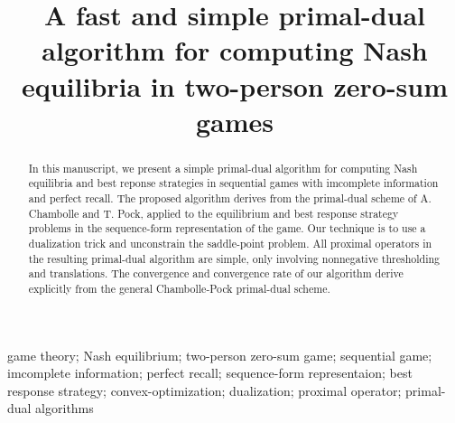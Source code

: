 \documentclass[a4paper,9pt,journal]{IEEEtran}
\begin{document}
\onecolumn
\title{A fast and simple primal-dual algorithm for computing Nash equilibria in two-person zero-sum games}


\author{}


\maketitle

\begin{abstract}
% 
In this manuscript, we present a simple primal-dual algorithm for computing Nash equilibria and best reponse strategies in  sequential games with
imcomplete information and perfect recall. The proposed algorithm derives from the primal-dual scheme of A. Chambolle and T. Pock, applied to the
equilibrium and best response strategy problems in the sequence-form representation of the game. Our technique is to use a dualization
trick and unconstrain the saddle-point problem. All proximal operators in the resulting primal-dual algorithm are simple,
only involving nonnegative thresholding and translations.
The convergence and convergence rate of our algorithm derive explicitly from the general Chambolle-Pock primal-dual scheme.

\end{abstract}


\begin{IEEEkeywords}
  game theory; Nash equilibrium; two-person zero-sum game; sequential game; imcomplete information; perfect recall; sequence-form representaion;
  best response strategy; convex-optimization; dualization; proximal operator; primal-dual algorithms
\end{IEEEkeywords}
\end{document}
